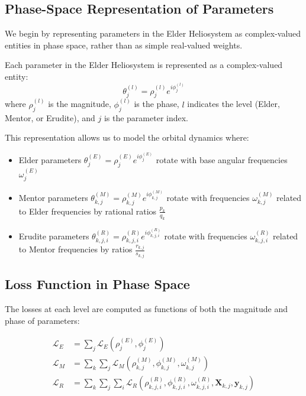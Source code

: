 \subsection{Phase-Space Representation of Parameters}

We begin by representing parameters in the Elder Heliosystem as complex-valued entities in phase space, rather than as simple real-valued weights.

\begin{definition}
Each parameter in the Elder Heliosystem is represented as a complex-valued entity:
\begin{equation}
\theta^{(l)}_j = \rho^{(l)}_j e^{i\phi^{(l)}_j}
\end{equation}
where $\rho^{(l)}_j$ is the magnitude, $\phi^{(l)}_j$ is the phase, $l$ indicates the level (Elder, Mentor, or Erudite), and $j$ is the parameter index.
\end{definition}

This representation allows us to model the orbital dynamics where:
\begin{itemize}
    \item Elder parameters $\theta^{(E)}_j = \rho^{(E)}_j e^{i\phi^{(E)}_j}$ rotate with base angular frequencies $\omega^{(E)}_j$
    \item Mentor parameters $\theta^{(M)}_{k,j} = \rho^{(M)}_{k,j} e^{i\phi^{(M)}_{k,j}}$ rotate with frequencies $\omega^{(M)}_{k,j}$ related to Elder frequencies by rational ratios $\frac{p_k}{q_k}$
    \item Erudite parameters $\theta^{(R)}_{k,j,i} = \rho^{(R)}_{k,j,i} e^{i\phi^{(R)}_{k,j,i}}$ rotate with frequencies $\omega^{(R)}_{k,j,i}$ related to Mentor frequencies by ratios $\frac{r_{k,j}}{s_{k,j}}$
\end{itemize}

\subsection{Loss Function in Phase Space}

The losses at each level are computed as functions of both the magnitude and phase of parameters:

\begin{align}
\mathcal{L}_E &= \sum_j \mathcal{L}_E(\rho^{(E)}_j, \phi^{(E)}_j) \\
\mathcal{L}_M &= \sum_k \sum_j \mathcal{L}_M(\rho^{(M)}_{k,j}, \phi^{(M)}_{k,j}, \omega^{(M)}_{k,j}) \\
\mathcal{L}_R &= \sum_k \sum_j \sum_i \mathcal{L}_R(\rho^{(R)}_{k,j,i}, \phi^{(R)}_{k,j,i}, \omega^{(R)}_{k,j,i}, \mathbf{X}_{k,j}, \mathbf{y}_{k,j})
\end{align}

